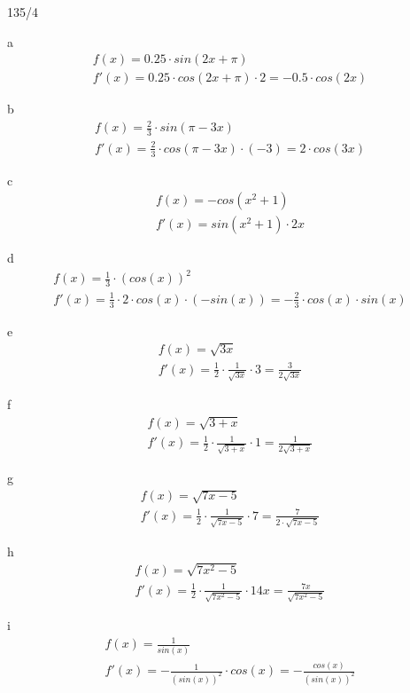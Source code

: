 \begin{exercise}{135/4}
  \item [a]
  \begin{gather*}
    f(x) = 0.25 \cdot sin(2x + \pi) \\
    f'(x) = 0.25 \cdot cos(2x + \pi) \cdot 2 = -0.5 \cdot cos(2x)
  \end{gather*}
  \item [b]
  \begin{gather*}
    f(x) = \frac{2}{3} \cdot sin(\pi - 3x) \\
    f'(x) = \frac{2}{3} \cdot cos(\pi - 3x) \cdot (-3) = 2 \cdot cos(3x)
  \end{gather*}
  \item [c]
  \begin{gather*}
    f(x) = -cos(x^2 + 1) \\
    f'(x) = sin(x^2 + 1) \cdot 2x
  \end{gather*}
  \item [d]
  \begin{gather*}
    f(x) = \frac{1}{3} \cdot (cos(x))^2 \\
    f'(x) = \frac{1}{3} \cdot 2 \cdot cos(x) \cdot (-sin(x)) = -\frac{2}{3} \cdot cos(x) \cdot sin(x)
  \end{gather*}
  \item [e]
  \begin{gather*}
    f(x) = \sqrt{3x} \\
    f'(x) = \frac{1}{2} \cdot \frac{1}{\sqrt{3x}} \cdot 3 = \frac{3}{2\sqrt{3x}}
  \end{gather*}
  \item [f]
  \begin{gather*}
    f(x) = \sqrt{3 + x} \\
    f'(x) = \frac{1}{2} \cdot \frac{1}{\sqrt{3 + x}} \cdot 1 = \frac{1}{2\sqrt{3 + x}}
  \end{gather*}
  \item [g]
  \begin{gather*}
    f(x) = \sqrt{7x - 5} \\
    f'(x) = \frac{1}{2} \cdot \frac{1}{\sqrt{7x - 5}} \cdot 7 = \frac{7}{2 \cdot \sqrt{7x - 5}}
  \end{gather*}
  \item [h]
  \begin{gather*}
    f(x) = \sqrt{7x^2 - 5} \\
    f'(x) = \frac{1}{2} \cdot \frac{1}{\sqrt{7x^2 - 5}} \cdot 14x = \frac{7x}{\sqrt{7x^2 - 5}}
  \end{gather*}
  \item [i]
  \begin{gather*}
    f(x) = \frac{1}{sin(x)} \\
    f'(x) = -\frac{1}{(sin(x))^2} \cdot cos(x) = -\frac{cos(x)}{(sin(x))^2}
  \end{gather*}
\end{exercise}
